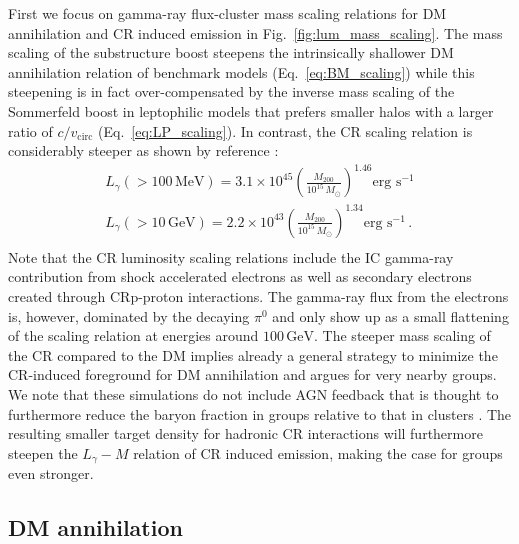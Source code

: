 \documentclass[10pt,aps,pra,reprint,amsmath,amsfonts,amssymb,showpacs,nofootinbib,floatfix]{revtex4-1}
\newcommand{\rmn}{\mathrm}
\newcommand{\msun}{M_\odot}
\newcommand{\mev}{\rmn{MeV}}
\newcommand{\gev}{\rmn{GeV}}
\newcommand{\mvir}{M_{200}}
\begin{document}
First we focus on gamma-ray flux-cluster mass scaling relations for DM
annihilation and CR induced emission in Fig.~\ref{fig:lum_mass_scaling}.  The
mass scaling of the substructure boost steepens the intrinsically shallower DM
annihilation relation of benchmark models (Eq.~\ref{eq:BM_scaling}) while
this steepening is in fact over-compensated by the inverse mass scaling of the
Sommerfeld boost in leptophilic models that prefers smaller halos with a larger
ratio of $c/v_\mathrm{circ}$ (Eq.~\ref{eq:LP_scaling}). In contrast, the
CR scaling relation is considerably steeper as shown by reference
\cite{2010MNRAS.409..449P}: 
\begin{eqnarray}
L_{\gamma}(>100\,\mev) = 3.1\times10^{45}
\left(\frac{\mvir}{10^{15}\,\msun}\right)^{1.46}\mbox{erg~s}^{-1}\nonumber\\
L_{\gamma}(>10\,\gev)  = 2.2\times10^{43}
\left(\frac{\mvir}{10^{15}\,\msun}\right)^{1.34}\mbox{erg~s}^{-1}\,.\nonumber\\
\end{eqnarray}
Note that the CR luminosity scaling relations include the IC gamma-ray
contribution from shock accelerated electrons as well as secondary
electrons created through CRp-proton interactions. The gamma-ray flux
from the electrons is, however, dominated by the decaying $\pi^0$ and
only show up as a small flattening of the scaling relation at energies
around $100\,\gev$. The steeper mass scaling of the CR compared to the
DM implies already a general strategy to minimize the CR-induced
foreground for DM annihilation and argues for very nearby groups. We
note that these simulations do not include AGN feedback that is
thought to furthermore reduce the baryon fraction in groups relative
to that in clusters \cite{2008ApJ...687L..53P}. The resulting smaller
target density for hadronic CR interactions will furthermore steepen
the $L_\gamma-M$ relation of CR induced emission, making the case for
groups even stronger.

\subsection{DM annihilation}
\end{document}
